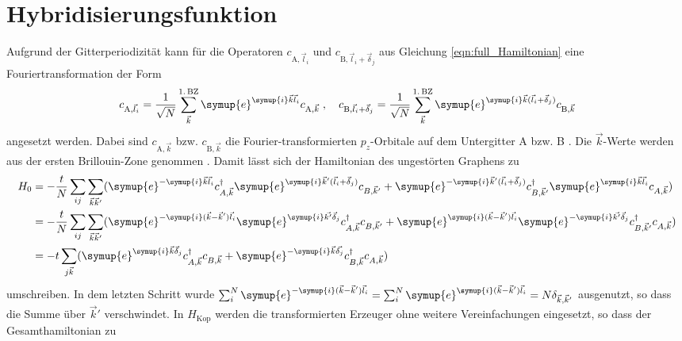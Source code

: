 \section{Hybridisierungsfunktion}
\label{sec:calc_greensfunction}
Aufgrund der Gitterperiodizität kann für die Operatoren $c_{\text{A},\vec{l}_i}$ und $c_{\text{B},\vec{l}_i+\vec{\delta}_j}$ aus Gleichung \eqref{eqn:full_Hamiltonian} eine Fouriertransformation der Form 
\begin{equation}
    c_{\text{A},\vec{l}_i} = \frac{1}{\sqrt{N}} \sum_{\vec{k}}^{1. \, \text{BZ}} \symup{e}^{\symup{i}\vec{k}\vec{l}_i} c_{\text{A}, \vec{k}} \; , 
    \quad c_{\text{B},\vec{l}_i+\vec{\delta}_j} = \frac{1}{\sqrt{N}} \sum_{\vec{k}}^{1. \, \text{BZ}} \symup{e}^{\symup{i}\vec{k}(\vec{l}_i+\vec{\delta}_j)} c_{\text{B}, \vec{k}} \label{eqn:fourier_ladder}
\end{equation}
angesetzt werden.
Dabei sind $c_{\text{A}, \vec{k}}$ bzw. $c_{\text{B}, \vec{k}}$ die Fourier-transformierten $p_z$-Orbitale auf dem Untergitter A bzw. B \cite{anders-fkt}.
Die $\vec{k}$-Werte werden aus der ersten Brillouin-Zone genommen \cite{anders-fkt}.
Damit lässt sich der Hamiltonian des ungestörten Graphens zu 
\begin{align*}
    H_0 &= -\frac{t}{N} \sum_{ij} \sum_{\vec{k}\vec{k}'} ( \symup{e}^{-\symup{i}\vec{k}\vec{l}_i}c^\dagger_{A,\vec{k}} 
    \symup{e}^{\symup{i}\vec{k}'(\vec{l}_i+\vec{\delta}_j)}c_{B,\vec{k}'} + \symup{e}^{-\symup{i}\vec{k}'(\vec{l}_i+\vec{\delta}_j)} c^\dagger_{B,\vec{k}'} 
    \symup{e}^{\symup{i}\vec{k}\vec{l}_i}c_{A,\vec{k}}) \\
    &= -\frac{t}{N} \sum_{ij} \sum_{\vec{k}\vec{k}'} ( \symup{e}^{-\symup{i}(\vec{k}- \vec{k}')\vec{l}_i}\symup{e}^{\symup{i}\vec{k'}\vec{\delta}_j}c^\dagger_{A,\vec{k}} c_{B,\vec{k}'} + 
    \symup{e}^{\symup{i}(\vec{k}- \vec{k}')\vec{l}_i} \symup{e}^{-\symup{i}\vec{k'}\vec{\delta}_j} c^\dagger_{B,\vec{k}'}c_{A,\vec{k}}) \\
    &= -t \sum_{j\vec{k}} ( \symup{e}^{\symup{i}\vec{k}\vec{\delta}_j}c^\dagger_{A,\vec{k}} c_{B,\vec{k}} + 
    \symup{e}^{-\symup{i}\vec{k}\vec{\delta_j}} c^\dagger_{B,\vec{k}}c_{A,\vec{k}})
\end{align*}
umschreiben.
In dem letzten Schritt wurde $\sum_{i}^N \symup{e}^{-\symup{i}(\vec{k}- \vec{k}')\vec{l}_i} 
= \sum_{i}^N \symup{e}^{\symup{i}(\vec{k}- \vec{k}')\vec{l}_i} = N\delta_{\vec{k}, \vec{k}'}$ ausgenutzt, so dass die Summe über $\vec{k}'$ verschwindet.
In $H_\text{Kop}$ werden die transformierten Erzeuger ohne weitere Vereinfachungen eingesetzt,  so dass der Gesamthamiltonian zu 
